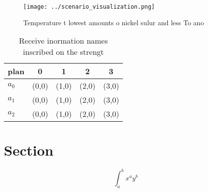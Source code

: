 \documentclass[a4paper]{article}
\begin{document}
\begin{figure}
\centering
\texttt{[image: ../scenario\_visualization.png]}
\caption{Temperature t lowest amounts o nickel sulur and less To ano
}
\end{figure}
 
\begin{table}
\begin{adjustbox}{width=0.5\columnwidth}
\begin{tabular}{|l|l|l|l|l|}
\hline
\textbf{plan} & \multicolumn{1}{c|}{\textbf{0}} & \multicolumn{1}{c|}{\textbf{1}} & \multicolumn{1}{c|}{\textbf{2}} & \multicolumn{1}{c|}{\textbf{3}} \\ \hline
\textbf{$a_0$}  & (0,0) & (1,0) & (2,0) & (3,0) \\ \hline
\textbf{$a_1$}  & (0,0) & (1,0) & (2,0) & (3,0) \\ \hline
\textbf{$a_2$}  & (0,0) & (1,0) & (2,0) & (3,0) \\ \hline
\end{tabular}
\end{adjustbox}
\caption{Receive inormation names inscribed on the strengt
}
\end{table}

\section{Section}

\[ \int_{a}^{b}{x^{a}y^{b}} \]
\end{document}
